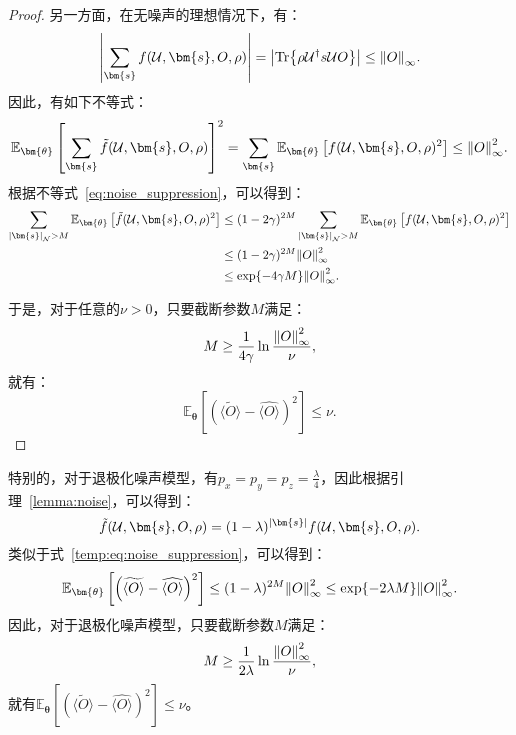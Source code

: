 \begin{proof}
    另一方面，在无噪声的理想情况下，有：
    \begin{equation}
        \abs{\sum_{\bm{s}}f(\mathcal{U},\bm{s},O,\rho)}=\abs{\Tr{\rho \mathcal{U}^\dagger s \mathcal{U} O}}\leq\norm{O}_\infty.
    \end{equation}
    因此，有如下不等式：
    \begin{equation}
        \mathbb{E}_{\bm{\theta}}\left[ \sum_{\bm{s}}\tilde{f}(\mathcal{U},\bm{s},O,\rho)\right]^2=\sum_{\bm{s}}\mathbb{E}_{\bm{\theta}}\left[f(\mathcal{U},\bm{s},O,\rho)^2\right]\leq\norm{O}_\infty^2.
    \end{equation}
    根据不等式~\eqref{eq:noise_suppression}，可以得到：
    \begin{equation}\label{temp:eq:noise_suppression}
        \begin{aligned}
            \sum_{\abs{\bm{s}}_{\mathcal{N}}>M}\mathbb{E}_{\bm{\theta}}\left[\tilde{f}(\mathcal{U},\bm{s},O,\rho)^2\right] &\leq (1-2\gamma)^{2M} \sum_{\abs{\bm{s}}_{\mathcal{N}}>M}\mathbb{E}_{\bm{\theta}}\left[f(\mathcal{U},\bm{s},O,\rho)^2\right]\\
            &\leq (1-2\gamma)^{2M} \norm{O}_\infty^2\\
            &\leq \exp{-4\gamma M} \norm{O}_\infty^2.
        \end{aligned}
    \end{equation}

    于是，对于任意的$\nu > 0$，只要截断参数$M$满足：
    \begin{equation}
        M\geq\frac{1}{4\gamma}\ln{\frac{\norm{O}_\infty^2}{\nu}},
    \end{equation}
    就有：
    \begin{equation}
        \mathbb{E}_{\bm{\theta}}\left[\left(\widetilde{\langle O\rangle}-\widehat{\langle O\rangle}\right)^2\right]\leq\nu.
    \end{equation}
\end{proof}
\begin{remark}
    特别的，对于退极化噪声模型，有$p_x=p_y=p_z=\frac{\lambda}{4}$，因此根据引理~\ref{lemma:noise}，可以得到：
    \begin{equation}
        \tilde{f}(\mathcal{U},\bm{s},O,\rho)=(1-\lambda)^{\abs{\bm{s}}}f(\mathcal{U},\bm{s},O,\rho).
    \end{equation}
    类似于式~\eqref{temp:eq:noise_suppression}，可以得到：
    \begin{equation}
        \mathbb{E}_{\bm{\theta}}\left[\left(\widetilde{\langle O\rangle}-\widehat{\langle O\rangle}\right)^2\right] \leq (1-\lambda)^{2M} \norm{O}_\infty^2 \leq \exp{-2\lambda M} \norm{O}_\infty^2.
    \end{equation}
    因此，对于退极化噪声模型，只要截断参数$M$满足：
    \begin{equation}
        M\geq\frac{1}{2\lambda}\ln{\frac{\norm{O}_\infty^2}{\nu}},
    \end{equation}
    就有$\mathbb{E}_{\bm{\theta}}\left[\left(\widetilde{\langle O\rangle}-\widehat{\langle O\rangle}\right)^2\right]\leq\nu$。
\end{remark}


